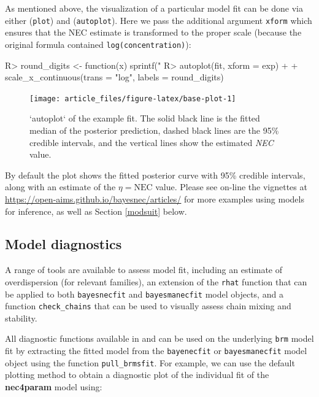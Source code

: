 \documentclass[
  shortnames]{jss}
\begin{document}
As mentioned above, the visualization of a particular model fit can be done via either   (\texttt{plot}) and  \citep{ggplot} (\texttt{autoplot}). Here we pass the additional argument \texttt{xform} which ensures that the NEC estimate is transformed to the proper scale (because the original formula contained \texttt{log(concentration)}):

\begin{CodeChunk}
\begin{CodeInput}
R> round_digits <- function(x) sprintf("%
R> autoplot(fit, xform = exp) +
+   scale_x_continuous(trans = "log", labels = round_digits)
\end{CodeInput}
\begin{figure}[!ht]

{\centering \texttt{[image: article\_files/figure-latex/base-plot-1]} 

}

\caption{ `autoplot` of the example fit. The solid black line is the fitted median of the posterior prediction, dashed black lines are the 95\% credible intervals, and the vertical lines show the estimated \textit{NEC} value.}\label{fig:base-plot}
\end{figure}
\end{CodeChunk}

By default the plot shows the fitted posterior curve with 95\% credible intervals, along with an estimate of the \(\eta = \text{NEC}\) value. Please see on-line the vignettes at \url{https://open-aims.github.io/bayesnec/articles/} for more examples using  models for inference, as well as Section \ref{modsuit} below.

\hypertarget{model-diagnostics}{%
\subsection{Model diagnostics}\label{model-diagnostics}}

A range of tools are available to assess model fit, including an estimate of overdispersion (for relevant families), an extension of the  \texttt{rhat} function that can be applied to both \texttt{bayesnecfit} and \texttt{bayesmanecfit} model objects, and a function \texttt{check\_chains} that can be used to visually assess chain mixing and stability.

All diagnostic functions available in  and  can be used on the underlying \texttt{brm} model fit by extracting the fitted  model from the \texttt{bayenecfit} or \texttt{bayesmanecfit} model object using the function \texttt{pull\_brmsfit}. For example, we can use the default  plotting method to obtain a diagnostic plot of the individual fit of the \textbf{nec4param} model using:
\end{document}
